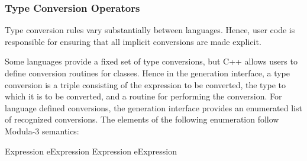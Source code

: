 \begin{functionality}
\modulaOp
\end{functionality}
\begin{functionality}
\modulaOp
\end{functionality}
\begin{functionality}
\modulaOp
\end{functionality}
\begin{functionality}
\modulaOp
\end{functionality}
\begin{functionality}
\modulaOp
\end{functionality}
\begin{functionality}
\modulaOp
\end{functionality}

\subsubsection{Type Conversion Operators}

Type conversion rules vary substantially between languages.  Hence,
user code is responsible for ensuring that all implicit conversions
are made explicit.  

Some languages provide a fixed set of type conversions, but C++ allows
users to define conversion routines for classes.  Hence in the
generation interface, a type conversion is a triple consisting of the
expression to be converted, the type to which it is to be converted,
and a routine for performing the conversion.  For language defined
conversions, the generation interface provides an enumerated list of
recognized conversions.  The elements of the following enumeration
follow Modula-3 semantics:

	{Expression e}{Expression}
	{Expression e}{Expression}

